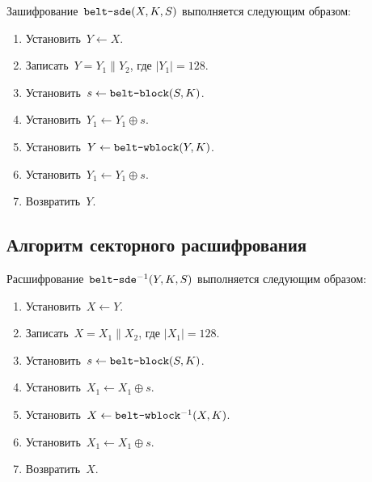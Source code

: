 Зашифрование~$\texttt{belt-sde}(X,K,S)$ выполняется следующим образом: 
\begin{enumerate}
\item
Установить~$Y\leftarrow X$.
\item
Записать~$Y=Y_1\parallel Y_2$, где $|Y_1|=128$.
\item
Установить~$s\leftarrow \texttt{belt-block}(S,K)$.
\item
Установить~$Y_1\leftarrow Y_1\oplus s$.
\item
Установить~$Y\leftarrow\texttt{belt-wblock}(Y,K)$.
\item
Установить~$Y_1\leftarrow Y_1\oplus s$.
\item
Возвратить~$Y$.
\end{enumerate}

\subsection{Алгоритм секторного расшифрования}\label{DSK.SDE.Decr}

Расшифрование~$\texttt{belt-sde}^{-1}(Y,K,S)$ выполняется следующим образом: 
\begin{enumerate}
\item
Установить~$X\leftarrow Y$.
\item
Записать~$X=X_1\parallel X_2$, где $|X_1|=128$.
\item
Установить~$s\leftarrow \texttt{belt-block}(S,K)$.
\item
Установить~$X_1\leftarrow X_1\oplus s$.
\item
Установить~$X\leftarrow\texttt{belt-wblock}^{-1}(X,K)$.
\item
Установить~$X_1\leftarrow X_1\oplus s$.
\item
Возвратить~$X$.
\end{enumerate}
